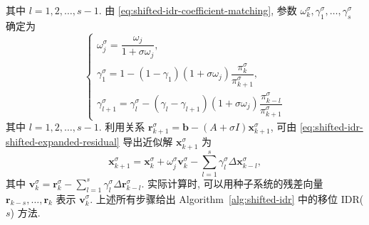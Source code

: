 {其中 $l=1,2,\ldots,s-1$. 由 \eqref{eq:shifted-idr-coefficient-matching}, 参数 $\omega_k^{\sigma},\gamma_1^{\sigma},\ldots,\gamma_s^{\sigma}$ 确定为}
\begin{equation}\label{eq:shifted-idr-parameters}\begin{cases}\omega_j^{\sigma}=\dfrac{\omega_j}{1+\sigma\omega_j},\\
\gamma_1^{\sigma}=1-(1-\gamma_1)(1+\sigma\omega_j)\dfrac{\pi_k^{\sigma}}{\pi_{k+1}^{\sigma}},\\
\gamma_{l+1}^{\sigma}=\gamma_l^{\sigma}-(\gamma_l-\gamma_{l+1})(1+\sigma\omega_j)\dfrac{\pi_{k-l}^{\sigma}}{\pi_{k+1}^{\sigma}}\end{cases}\end{equation}
{其中 $l=1,2,\ldots,s-1$.}
{利用关系 $\bm r_{k+1}^{\sigma}=\bm b-(A+\sigma I)\bm x_{k+1}^{\sigma}$, 可由 \eqref{eq:shifted-idr-shifted-expanded-residual} 导出近似解 $\bm x_{k+1}^{\sigma}$ 为}
\begin{equation}\label{eq:shifted-idr-main-solution}\bm x_{k+1}^{\sigma}=\bm x_k^{\sigma}+\omega_j^{\sigma}\bm v_k^{\sigma}-\sum_{l=1}^{s}\gamma_l^{\sigma}\Delta\bm x_{k-l}^{\sigma},\end{equation}
{其中 $\bm v_k^{\sigma}=\bm r_k^{\sigma}-\sum_{l=1}^{s}\gamma_l^{\sigma}\Delta\bm r_{k-l}^{\sigma}$. 实际计算时, 可以用种子系统的残差向量 $\bm r_{k-s},\ldots,\bm r_k$ 表示 $\bm v_k^{\sigma}$. 上述所有步骤给出 Algorithm\ \ref{alg:shifted-idr} 中的移位 IDR($s$) 方法.}
